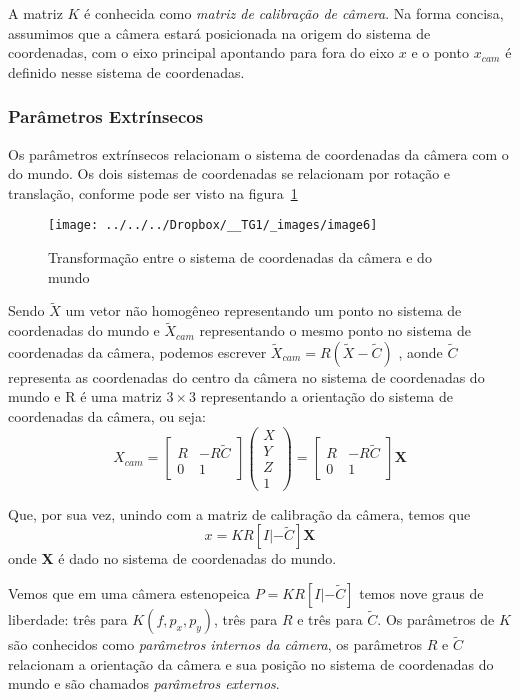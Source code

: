 \documentclass[ecp,tc]{iiufrgs}
\begin{document}
A matriz $ K $ é conhecida como \textit{matriz de calibração de câmera}. Na forma concisa, assumimos que a câmera estará posicionada na origem do sistema de coordenadas, com o eixo principal apontando para fora do eixo $ x $ e o ponto $ x_{cam} $ é definido nesse sistema de coordenadas.

\subsubsection{Parâmetros Extrínsecos}
\label{sec:extrinsic}
Os parâmetros extrínsecos relacionam o sistema de coordenadas da câmera com o do mundo. Os dois sistemas de coordenadas se relacionam por rotação e translação, conforme pode ser visto na figura~\ref{fig:image6}

\begin{figure}
	\centering
	\caption{Transformação entre o sistema de coordenadas da câmera e do mundo}
	\texttt{[image: ../../../Dropbox/\_\_TG1/\_images/image6]}
	\label{fig:image6}
\end{figure}

Sendo $ \widetilde{X} $ um vetor não homogêneo representando um ponto no sistema de coordenadas do mundo e $ \widetilde{X}_{cam} $ representando o mesmo ponto no sistema de coordenadas da câmera, podemos escrever $ \widetilde{X}_{cam} = R(\widetilde{X} - \widetilde{C}) $ , aonde $ \widetilde{C} $ representa as coordenadas do centro da câmera no sistema de coordenadas do mundo e R é uma matriz $ 3 \times 3 $ representando a orientação do sistema de coordenadas da câmera, ou seja:
\[ X_{cam} =
\begin{bmatrix} R & -R\widetilde{C} \\ 
0 & 1 \end{bmatrix}
\begin{pmatrix} X \\ Y \\ Z \\ 1 \end{pmatrix} =
\begin{bmatrix} R & -R\widetilde{C} \\ 
0 & 1 \end{bmatrix}
\textbf{X}  \]

Que, por sua vez, unindo com a matriz de calibração da câmera, temos que \[x = KR[I|-\widetilde{C}]\textbf{X} \] onde \textbf{X} é dado no sistema de coordenadas do mundo.

Vemos que em uma câmera estenopeica $ P = KR[I|-\widetilde{C}] $ temos nove graus de liberdade: três para $ K(f, p_x, p_y) $, três para $ R $ e três para $ \widetilde{C} $. Os parâmetros de $K$ são conhecidos como \textit{parâmetros internos da câmera}, os
parâmetros $R$ e $\widetilde{C}$ relacionam a orientação da câmera e sua posição no sistema de coordenadas do mundo e são chamados \textit{parâmetros externos}.
\end{document}
